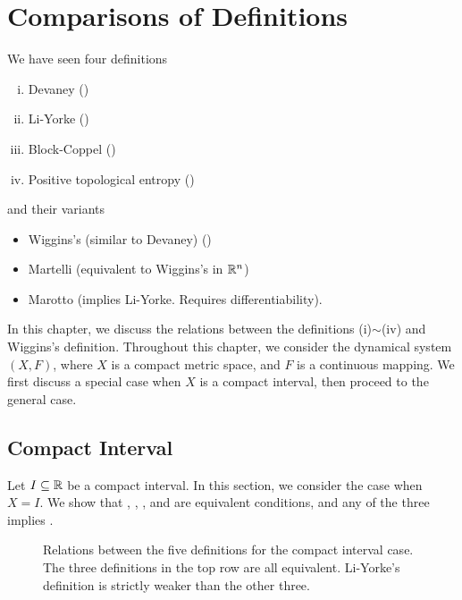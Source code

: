 \documentclass[10pt,twoside,draft]{book}
\begin{document}
\label{chap:comparison}
\chapter{Comparisons of Definitions}
We have seen four definitions 
\begin{enumerate}[(i)]
  \item Devaney (\dev)
  \item Li-Yorke (\liy)
  \item Block-Coppel (\blcp)
  \item Positive topological entropy (\pte)
\end{enumerate}
and their variants
\begin{itemize}
  \item Wiggins's (similar to Devaney) (\wig)
  \item Martelli (equivalent to Wiggins's in $\mathbb{R}^n$)
  \item Marotto (implies Li-Yorke. Requires differentiability).
\end{itemize}
In this chapter, we discuss the relations between the definitions (i)$\sim$(iv) and Wiggins's definition.
Throughout this chapter, we consider the dynamical system $(X,F)$, where $X$ is a compact metric space, and $F$ is a continuous mapping.
We first discuss a special case when $X$ is a compact interval, then proceed to the general case.

\section{Compact Interval}
Let $I \subseteq \mathbb{R}$ be a compact interval.
In this section, we consider the case when $X = I$.
We show that \dev, \wig, \blcp, and \pte are equivalent conditions, and any of the three implies \liy.
\begin{figure}[ht]
  \centering
  \label{fig:chaos-interval}
  \caption{
    Relations between the five definitions for the compact interval case.
    The three definitions in the top row are all equivalent.
    Li-Yorke's definition is strictly weaker than the other three.
  }
\end{figure}
\end{document}
